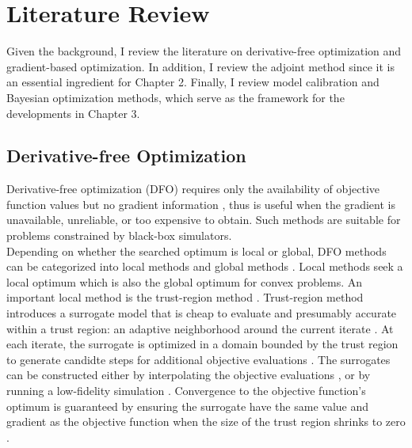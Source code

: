 \section{Literature Review}
\label{section: literature}

Given the background, I review the literature on derivative-free optimization and gradient-based optimization. In addition,
I review the adjoint method since it is an essential ingredient for Chapter 2. Finally, I review model calibration and Bayesian optimization methods, which serve as the framework for the developments in Chapter 3.

\subsection{Derivative-free Optimization}
\label{section: DFO}
Derivative-free optimization (DFO) requires only the availability of objective
function values but no gradient information \cite{gradfreereview}, thus is useful when the gradient
is unavailable, unreliable, or too expensive to obtain. 
Such methods are suitable for problems constrained by black-box simulators.\\

Depending on whether the searched optimum is local or global,
DFO methods can be categorized into local methods and global methods \cite{gradfreereview}.
Local methods seek a local optimum which is also the global optimum for convex problems. 
An important local method is the
trust-region method \cite{trust region review}. Trust-region method introduces a surrogate model that is
cheap to evaluate and presumably accurate within a trust region: an adaptive neighborhood around the current iterate \cite{trust region review}. 
At each iterate, the surrogate is optimized in a domain bounded by the trust region to generate
candidte steps for additional objective evaluations \cite{trust region review}.
The surrogates can be constructed either by interpolating the objective evaluations \cite{linear trust region, trustregionwild}, or by running a low-fidelity simulation \cite{MFO trust region,
Alexandrov trust region}.
Convergence to the objective function's optimum is guaranteed by ensuring the surrogate have the
same value and gradient as the objective function when the size of the trust region shrinks to zero
\cite{trustregionconn, trustregionwild}.\\

